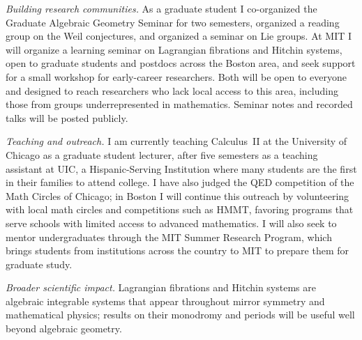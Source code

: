 \documentclass[11pt]{article}
\theoremstyle{compact}
\begin{document}
\emph{Building research communities.} As a graduate student I co-organized the Graduate
Algebraic Geometry Seminar for two semesters, organized a reading group on the Weil
conjectures, and organized a seminar on Lie groups. At MIT I will organize a learning
seminar on Lagrangian fibrations and Hitchin systems, open to graduate students and postdocs
across the Boston area, and seek support for a small workshop for early-career
researchers. Both will be open to everyone and designed to
reach researchers who lack local access to this area, including those from groups
underrepresented in mathematics. Seminar notes and recorded talks will be posted publicly.

\emph{Teaching and outreach.} I am currently teaching Calculus~II at the University of
Chicago as a graduate student lecturer, after five semesters as a teaching assistant at UIC,
a Hispanic-Serving Institution where many students are the first in their families to attend
college. I have also judged the QED competition of the Math Circles of Chicago; in Boston I
will continue this outreach by volunteering with local math circles and competitions such as
HMMT, favoring programs that serve schools with limited access to advanced mathematics. I
will also seek to mentor undergraduates through the MIT Summer Research Program, which brings
students from institutions across the country to MIT to prepare them for graduate study.

\emph{Broader scientific impact.} Lagrangian fibrations and Hitchin systems are algebraic
integrable systems that appear throughout mirror symmetry and mathematical physics; results
on their monodromy and periods will be useful well beyond algebraic geometry.

\clearpage


\end{document}

